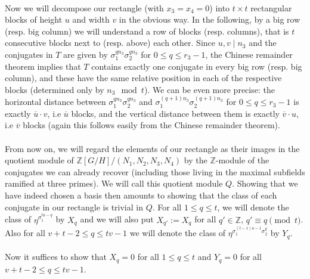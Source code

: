 \documentclass[12pt,a4paper]{article}
\newcommand{\Z}{\mathbb{Z}}
\newcommand{\uo}{\overline{u}}
\newcommand{\vo}{\overline{v}}
\newcommand{\lcm}{\mathrm{lcm}}
\begin{document}
\paragraph*{}
Now we will decompose our rectangle (with $x_3=x_4=0$) into $t\times t$ rectangular blocks of height $u$ and width $v$ in the obvious way. In the following, by a big row (resp. big column) we will understand a row of blocks (resp. columns), that is $t$ consecutive blocks next to (resp. above) each other. Since $u,v\mid n_3$ and the conjugates in $T$ are given by $\sigma_1^{qn_3}\sigma_2^{qn_3}$ for $0\leq q \leq r_3-1$, the Chinese remainder theorem implies that $T$ contains exactly one conjugate in every big row (resp. big column), and these have the same relative position in each of the respective blocks (determined only by $n_3 \mod t$). We can be even more precise: the horizontal distance between $\sigma_1^{qn_3}\sigma_2^{qn_3}$ and $\sigma_1^{(q+1)n_3}\sigma_2^{(q+1)n_3}$ for $0\leq q \leq r_3-1$ is exactly $\uo\cdot v$, i.e $\uo$ blocks, and the vertical distance between them is exactly $\vo\cdot u$, i.e $\vo$ blocks (again this follows easily from the Chinese remainder theorem).
\paragraph*{}
From now on, we will regard the elements of our rectangle as their images in the quotient module of $\Z[G/H]/(N_1,N_2,N_3,N_4)$ by the $\Z$-module of the conjugates we can already recover (including those living in the maximal subfields ramified at three primes). We will call this quotient module $Q$. Showing that we have indeed chosen a basis then amounts to showing that the class of each conjugate in our rectangle is trivial in $Q$. For all $1\leq q\leq t$, we will denote the class of $\eta^{\sigma_1^{tu-q}}$ by $X_q$ and we will also put $X_{q'}:=X_q$ for all $q'\in\Z$, $q'\equiv q\pmod{t}$. Also for all $v+t-2\leq q\leq tv-1$ we will denote the class of $\eta^{\sigma_1^{(t-1)u-1}\sigma_2^q}$ by $Y_q$.



\paragraph*{}
Now it suffices to show that $X_q=0$ for all $1\leq q\leq t$ and $Y_q=0$ for all $v+t-2\leq q\leq tv-1$.
\end{document}

